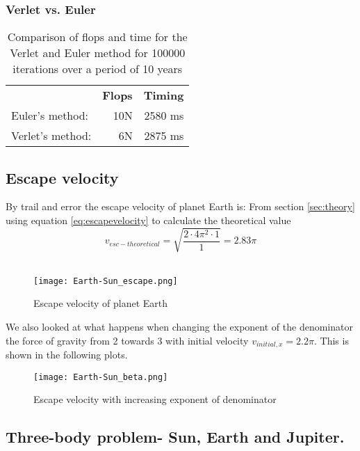\documentclass[../main.tex]{subfiles}
\begin{document}
\subsubsection{Verlet vs. Euler}\label{sec:Verlet_VS_Euler}
\begin{table}[!h]
  \caption{Comparison of flops and time for the Verlet and Euler method for 100000 iterations over a period of 10 years}
  \centering
  \begin{tabular}{l r r}
                            &\textbf{Flops}&\textbf{Timing}\\
    Euler's method:          &10N&2580 ms\\
    Verlet's method:          &6N&2875 ms\\
  \end{tabular}
  \label{tab:EulervsVerlet}
  \end{table}
\FloatBarrier

\subsection{Escape velocity}
By trail and error the escape velocity of planet Earth is:
From section \ref{sec:theory} using equation \ref{eq:escapevelocity} to calculate the  theoretical value $$v_{esc-theoretical} = \sqrt{\frac{2\cdot4\pi^2\cdot1}{1}} = 2.83 \pi$$\

\begin{figure}[h!]
  \centering
  \texttt{[image: Earth-Sun\_escape.png]}
  \caption{Escape velocity of planet Earth}
  \label{fig:v_esc}
\end{figure}

We also looked at what happens when changing the exponent of the denominator the force of gravity from 2 towards 3 with initial velocity $v_{initial,x} = 2.2\pi$. This is shown in the following plots.

\begin{figure}[h!]
  \centering
  \texttt{[image: Earth-Sun\_beta.png]}
  \caption{Escape velocity with increasing exponent of denominator}
  \label{fig:v_esc_beta}
\end{figure}

\subsection{Three-body problem- Sun, Earth and Jupiter.}
\end{document}
